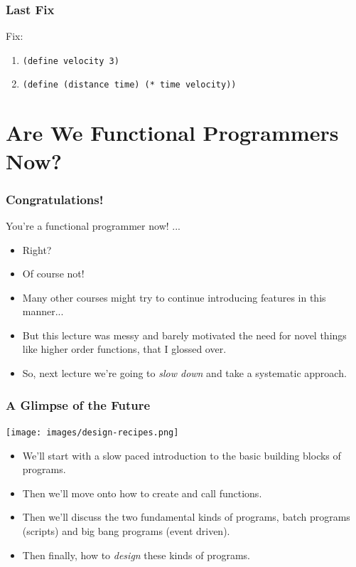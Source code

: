 \documentclass{beamer}
\begin{document}
\begin{frame}
  \frametitle{Last Fix}
  Fix:
  \begin{enumerate}
  \item<1-> \texttt{(define velocity 3)}
  \item<2-> \texttt{(define (distance time) (* time velocity))}
  \end{enumerate}
  \pause
  \versionFive
\end{frame}

\section{Are We Functional Programmers Now?}
\begin{frame}
  \frametitle{Congratulations!}
  You're a functional programmer now! ...
  \begin{itemize}
  \item<1-> Right?
  \item<2-> Of course not!
  \item<3-> Many other courses might try to continue introducing features in this manner...
  \item<4-> But this lecture was messy and barely motivated the need for novel
    things like higher order functions, that I glossed over.
  \item<5-> So, next lecture we're going to \emph{slow down} and take a systematic
    approach.
  \end{itemize}
\end{frame}

\begin{frame}
  \frametitle{A Glimpse of the Future}
  \begin{center}
    \texttt{[image: images/design-recipes.png]}
  \end{center}
  \begin{itemize}
  \item We'll start with a slow paced introduction to the basic building blocks
    of programs.
  \item Then we'll move onto how to create and call functions.
  \item Then we'll discuss the two fundamental kinds of programs, batch programs
    (scripts) and big bang programs (event driven).
  \item Then finally, how to \emph{design} these kinds of programs.
  \end{itemize}
\end{frame}
\end{document}
